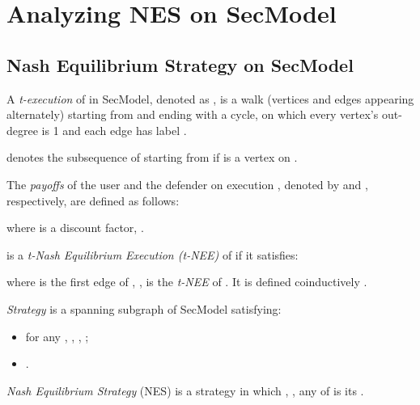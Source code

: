 \documentclass[10pt, conference, compsocconf]{IEEEtran}
\begin{document}
\section{Analyzing NES on SecModel}
\subsection{Nash Equilibrium Strategy on SecModel}
\begin{definition}
A \textit{t-execution} of  in {\rm SecModel}, denoted as , is a walk (vertices and edges appearing alternately) starting from  and ending with a cycle, on which every vertex's out-degree is 1 and each edge  has label .
\end{definition}

 denotes the subsequence of  starting from  if  is a vertex on .

\begin{definition}
The \textit{payoffs} of the user and the defender on execution , denoted by  and , respectively, are defined as follows:

where  is a discount factor, .
\end{definition}

\begin{definition}
 is a \textit{t-Nash Equilibrium Execution (t-{\rm NEE})} of  if it satisfies:

where  is the first edge of ,
,
 is the \textit{t-{\rm NEE}} of . It is defined coinductively {\rm \cite{davide07}}.
\end{definition}

\begin{definition}
\textit{Strategy} is a spanning subgraph of {\rm SecModel} satisfying:
 \begin{itemize}
 \item for any , , , ;
 \item .
 \end{itemize}
\end{definition}

\begin{definition}
\textit{Nash Equilibrium Strategy} ({\rm NES}) is a strategy in which , , any  of  is its .
\end{definition}
\end{document}
